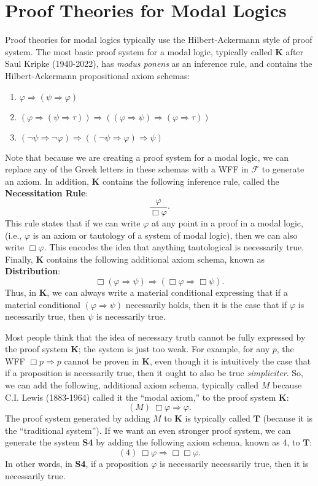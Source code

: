 \documentclass[11pt]{article}
\theoremstyle{definition}
\theoremstyle{remark}
\begin{document}
\section{Proof Theories for Modal Logics}
Proof theories for modal logics typically use the Hilbert-Ackermann style of proof system. The most basic proof system for a modal logic, typically called $\mathbf{K}$ after Saul Kripke (1940-2022), has \textit{modus ponens} as an inference rule, and contains the Hilbert-Ackermann propositional axiom schemas:
\begin{enumerate}
    \item $\varphi \Rightarrow (\psi \Rightarrow \varphi)$

    \item $(\varphi \Rightarrow (\psi \Rightarrow \tau)) \Rightarrow ((\varphi \Rightarrow \psi)\Rightarrow (\varphi \Rightarrow \tau))$

    \item $(\neg\psi \Rightarrow \neg\varphi)\Rightarrow ((\neg\psi\Rightarrow \varphi)\Rightarrow \psi)$
\end{enumerate}
Note that because we are creating a proof system for a modal logic, we can replace any of the Greek letters in these schemas with a WFF in $\mathcal{F}$ to generate an axiom. In addition, $\mathbf{K}$ contains the following inference rule, called the \textbf{Necessitation Rule}:
$$\frac{\varphi}{\Box \varphi}.$$
This rule states that if we can write $\varphi$ at any point in a proof in a modal logic, (i.e., $\varphi$ is an axiom or tautology of a system of modal logic), then we can also write $\Box \varphi$. This encodes the idea that anything tautological is necessarily true. Finally, $\mathbf{K}$ contains the following additional axiom schema, known as \textbf{Distribution}:
$$\Box (\varphi\Rightarrow\psi)\Rightarrow(\Box\varphi\Rightarrow\Box\psi).$$
Thus, in $\mathbf{K}$, we can always write a material conditional expressing that if a material conditional $(\varphi\Rightarrow\psi)$ necessarily holds, then it is the case that if $\varphi$ is necessarily true, then $\psi$ is necessarily true.\par


Most people think that the idea of necessary truth cannot be fully expressed by the proof system $\mathbf{K}$; the system is just too weak. For example, for any $p$, the WFF $\Box p \Rightarrow p$ cannot be proven in $\mathbf{K}$, even though it is intuitively the case that if a proposition is necessarily true, then it ought to also be true \textit{simpliciter}. So, we can add the following, additional axiom schema, typically called $M$ because C.I. Lewis (1883-1964) called it the ``modal axiom,'' to the proof system $\mathbf{K}$:
$$(M) \ \Box \varphi \Rightarrow \varphi.$$
The proof system generated by adding $M$ to $\mathbf{K}$ is typically called $\mathbf{T}$ (because it is the ``traditional system''). If we want an even stronger proof system, we can generate the system \textbf{S4} by adding the following axiom schema, known as 4, to $\mathbf{T}$:
$$(4) \ \Box \varphi\Rightarrow\Box\Box \varphi.$$
In other words, in \textbf{S4}, if a proposition $\varphi$ is necessarily necessarily true, then it is necessarily true.\par 
\end{document}
